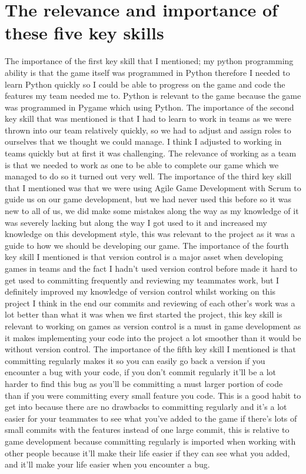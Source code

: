 \documentclass{scrartcl}
\begin{document}
\section{The  relevance  and  importance  of  these  five key skills}
The importance of the first key skill that I mentioned; my python programming ability is that the game itself was programmed in Python therefore I needed to learn Python quickly so I could be able to progress on the game and code the features my team needed me to. Python is relevant to the game because the game was programmed in Pygame which using Python. The importance of the second key skill that was mentioned is that I had to learn to work in teams as we were thrown into our team relatively quickly, so we had to adjust and assign roles to ourselves that we thought we could manage. I think I adjusted to working in teams quickly but at first it was challenging. The relevance of working as a team is that we needed to work as one to be able to complete our game which we managed to do so it turned out very well. The importance of the third key skill that I mentioned was that we were using Agile Game Development with Scrum to guide us on our game development, but we had never used this before so it was new to all of us, we did make some mistakes along the way as my knowledge of it was severely lacking but along the way I got used to it and increased my knowledge on this development style, this was relevant to the project as it was a guide to how we should be developing our game. The importance of the fourth key skill I mentioned is that version control is a major asset when developing games in teams and the fact I hadn’t used version control before made it hard to get used to committing frequently and reviewing my teammates work, but I definitely improved my knowledge of version control whilst working on this project I think in the end our commits and reviewing of each other's work was a lot better than what it was when we first started the project, this key skill is relevant to working on games as version control is a must in game development as it makes implementing your code into the project a lot smoother than it would be without version control. The importance of the fifth key skill I mentioned is that committing regularly makes it so you can easily go back a version if you encounter a bug with your code, if you don’t commit regularly it’ll be a lot harder to find this bug as you’ll be committing a must larger portion of code than if you were committing every small feature you code. This is a good habit to get into because there are no drawbacks to committing regularly and it’s a lot easier for your teammates to see what you’ve added to the game if there’s lots of small commits with the features instead of one large commit, this is relative to game development because committing regularly is imported when working with other people because it’ll make their life easier if they can see what you added, and it’ll make your life easier when you encounter a bug. 
\end{document}

